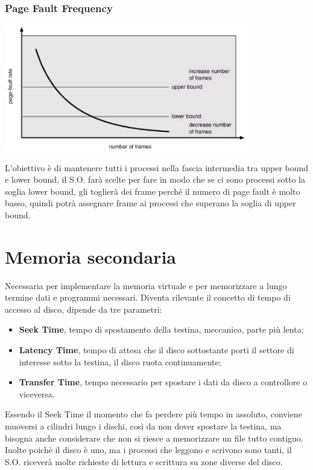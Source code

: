 \documentclass[a4paper, 12pt]{book}
\begin{document}
\subsection{Page Fault Frequency}

\begin{center}
    \includegraphics[width=0.8\textwidth]{pff.png}
\end{center}

L'obiettivo è di mantenere tutti i processi nella fascia 
intermedia tra upper bound e lower bound, il S.O. 
farà scelte per fare in modo che se ci sono processi 
sotto la soglia lower bound, gli toglierà dei frame perché 
il numero di page fault è molto basso, quindi potrà assegnare 
frame ai processi che superano la soglia di upper bound. 

\chapter{Memoria secondaria}

Necessaria per implementare la memoria virtuale e per memorizzare 
a lungo termine dati e programmi necessari. Diventa rilevante 
il concetto di tempo di accesso al disco, dipende da tre 
parametri:
\begin{itemize}
    \item \textbf{Seek Time}, tempo di spostamento della testina, meccanico, parte più lenta;
    \item \textbf{Latency Time}, tempo di attesa che il disco sottostante porti il settore di interesse sotto la testina, il disco ruota continuamente;
    \item \textbf{Transfer Time}, tempo necessario per spostare i dati da disco a controllore o viceversa.
\end{itemize}
Essendo il Seek Time il momento che fa perdere più tempo in 
assoluto, conviene muoversi a cilindri lungo i dischi, così 
da non dover spostare la testina, ma bisogna anche considerare 
che non si riesce a memorizzare un file tutto contiguo.
Inolte poichè il disco è uno, ma i processi che leggono e scrivono
sono tanti, il S.O. riceverà molte richieste di lettura 
e scrittura su zone diverse del disco.
\end{document}
